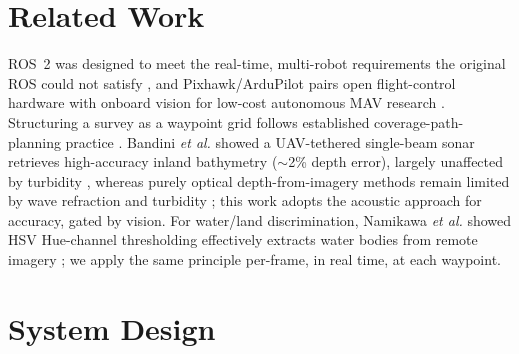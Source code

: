\documentclass[9pt,twocolumn]{article}
\begin{document}
\section{Related Work}
ROS~2 was designed to meet the real-time, multi-robot requirements the original ROS could not satisfy \cite{macenski2022ros2}, and Pixhawk/ArduPilot pairs open flight-control hardware with onboard vision for low-cost autonomous MAV research \cite{meier2012pixhawk}. Structuring a survey as a waypoint grid follows established coverage-path-planning practice \cite{galceran2013cpp}. Bandini \emph{et al.} showed a UAV-tethered single-beam sonar retrieves high-accuracy inland bathymetry ($\sim$2\% depth error), largely unaffected by turbidity \cite{bandini2018uavsonar}, whereas purely optical depth-from-imagery methods remain limited by wave refraction and turbidity \cite{specht2022shallowdepth}; this work adopts the acoustic approach for accuracy, gated by vision. For water/land discrimination, Namikawa \emph{et al.} showed HSV Hue-channel thresholding effectively extracts water bodies from remote imagery \cite{namikawa2016hsvwater}; we apply the same principle per-frame, in real time, at each waypoint.

\section{System Design}
\end{document}
